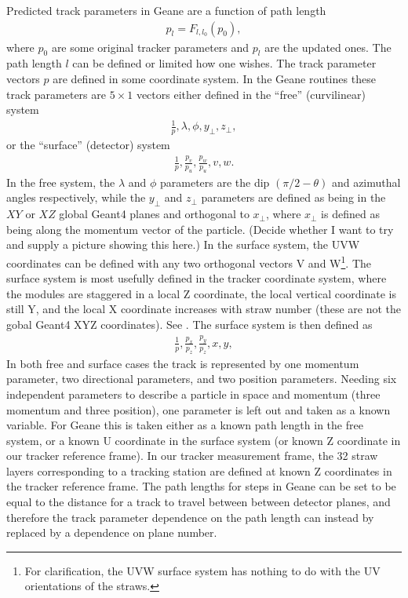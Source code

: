 Predicted track parameters in Geane are a function of path length 
        \begin{align} \label{eq:pp}
            p_{l} = F_{l,l_{0}}(p_{0}),
        \end{align}
where $p_{0}$ are some original tracker parameters and $p_{l}$ are the updated ones. The path length $l$ can be defined or limited how one wishes. The track parameter vectors $p$ are defined in some coordinate system. In the Geane routines these track parameters are $5 \times 1$ vectors either defined in the ``free'' (curvilinear) system
        \begin{align}
            \frac{1}{p}, \lambda, \phi, y_{\perp}, z_{\perp},
        \end{align}
or the ``surface'' (detector) system 
        \begin{align}
            \frac{1}{p}, \frac{p_{v}}{p_{u}}, \frac{p_{w}}{p_{u}}, v, w.
        \end{align}
In the free system, the $\lambda$ and $\phi$ parameters are the dip $(\pi/2 - \theta)$ and azimuthal angles respectively, while the $y_{\perp}$ and $z_{\perp}$ parameters are defined as being in the $XY$ or $XZ$ global Geant4 planes and orthogonal to $x_{\perp}$, where $x_{\perp}$ is defined as being along the momentum vector of the particle. (Decide whether I want to try and supply a picture showing this here.) In the surface system, the UVW coordinates can be defined with any two orthogonal vectors V and W\footnote{For clarification, the UVW surface system has nothing to do with the UV orientations of the straws.}. The surface system is most usefully defined in the tracker coordinate system, where the modules are staggered in a local Z coordinate, the local vertical coordinate is still Y, and the local X coordinate increases with straw number (these are not the gobal Geant4 XYZ coordinates). See . The surface system is then defined as
        \begin{align}
            \frac{1}{p}, \frac{p_{x}}{p_{z}}, \frac{p_{y}}{p_{z}}, x, y,
        \end{align}
In both free and surface cases the track is represented by one momentum parameter, two directional parameters, and two position parameters. Needing six independent parameters to describe a particle in space and momentum (three momentum and three position), one parameter is left out and taken as a known variable. For Geane this is taken either as a known path length in the free system, or a known U coordinate in the surface system (or known Z coordinate in our tracker reference frame). In our tracker measurement frame, the 32 straw layers corresponding to a tracking station are defined at known Z coordinates in the tracker reference frame. The path lengths for steps in Geane can be set to be equal to the distance for a track to travel between between detector planes, and therefore the track parameter dependence on the path length can instead by replaced by a dependence on plane number.


